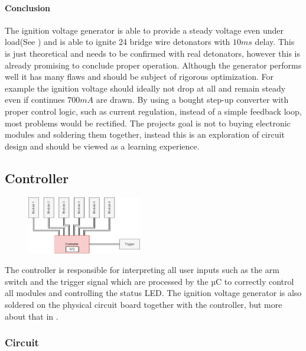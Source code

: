 \paragraph{Conclusion}
The ignition voltage generator is able to provide a steady voltage even under load(See ) and is able to ignite 24 bridge wire detonators with $10ms$ delay. This is just theoretical and needs to be confirmed with real detonators, however this is already promising to conclude proper operation. Although the generator performs well it has many flaws and should be subject of rigorous optimization. For example the ignition voltage should ideally not drop at all and remain steady even if continues $700mA$ are drawn. By using a bought step-up converter with proper control logic, such as current regulation, instead of a simple feedback loop, most problems would be rectified. The projects goal is not to buying electronic modules and soldering them together, instead this is an exploration of circuit design and should be viewed as a learning experience.


\pagebreak


\subsection{Controller}
\label{Controller}

\begin{figure}[!ht]
    \centering
    \includegraphics[width=5cm]{./Figures/concept_controller.png} 
\end{figure}

\noindent The controller is responsible for interpreting all user inputs such as the arm switch and the trigger signal which are processed by the µC to correctly control all modules and controlling the status LED.  The ignition voltage generator is also soldered on the physical circuit board together with the controller, but more about that in .

\subsubsection{Circuit}

